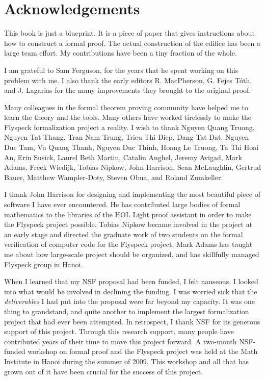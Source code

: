 

\section*{Acknowledgements}

This book is just a blueprint.  It is a piece of paper that gives instructions
about how to construct a formal proof.  The actual construction of the edifice
has been a large team effort.  My contributions have been a tiny fraction of the whole.

I am grateful to Sam Ferguson, for the years that
he spent working on this problem with me.  I also thank the early editors
R. MacPherson, G. Fejes T\'oth, and J. Lagarias for the many improvements
they brought to the original proof.

Many colleagues in the formal theorem proving community have helped me
to learn the theory and the tools.  Many others have worked tirelessly
 to make the Flyspeck formalization project a reality.  I wish to thank
Nguyen Quang Truong, %
Nguyen Tat Thang, %
Tran Nam Trung,
Trieu Thi Diep, Dang Tat Dat, Nguyen Duc Tam, Vu Quang Thanh, Nguyen
Duc Thinh, Hoang Le Truong, Ta Thi Hoai An, Erin Susick, Laurel Beth Martin, Catalin
Anghel, Jeremy Avigad, Mark Adams, Freek Wiedijk, Tobias Nipkow, John
Harrison, Sean McLaughlin, Gertrud Bauer, Matthew Wampler-Doty, Steven
Obua, and Roland Zumkeller. 

 I thank John Harrison for designing and implementing the most beautiful piece of
 software I have ever encountered.  He has contributed large bodies of formal mathematics to
the libraries of the HOL Light proof assistant in order to make the Flyspeck project
possible.   Tobias Nipkow became involved in the project at an early stage and
directed the graduate work of two students on the formal verification of computer
code for the Flyspeck project. Mark Adams has taught me about how
 large-scale project should be organized, and has skillfully managed 
  Flyspeck group in Hanoi.

  When I learned that my NSF proposal had been funded, I felt
  nauseous.  I looked into what would be involved in declining the
  funding.  I was  worried sick that the {\it deliverables} I had put
  into the proposal were far beyond my capacity.  It was one thing to
  grandstand, and quite another to implement the largest
  formalization project that had ever been attempted.  In retrospect, I
  thank NSF for its generous support of this project.  Through this
  research support, many people have contributed years of their time to move this
  project forward.  A two-month NSF-funded workshop on formal proof
  and the Flyspeck project was held at the Math Institute in Hanoi during the summer of
  2009.  This workshop and all that has grown out of it have been crucial for
  the success of this project.

